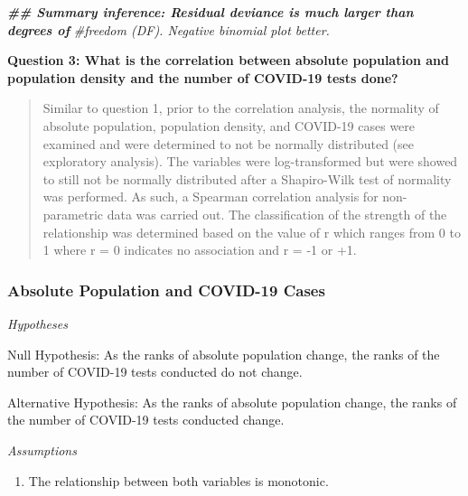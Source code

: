 \documentclass[
  12pt,
]{article}
\newenvironment{Shaded}{\begin{snugshade}}{\end{snugshade}}
\newcommand{\AttributeTok}[1]{\textcolor[rgb]{0.77,0.63,0.00}{#1}}
\newcommand{\CommentTok}[1]{\textcolor[rgb]{0.56,0.35,0.01}{\textit{#1}}}
\newcommand{\DocumentationTok}[1]{\textcolor[rgb]{0.56,0.35,0.01}{\textbf{\textit{#1}}}}
\newcommand{\FunctionTok}[1]{\textcolor[rgb]{0.00,0.00,0.00}{#1}}
\newcommand{\NormalTok}[1]{#1}
\newcommand{\OtherTok}[1]{\textcolor[rgb]{0.56,0.35,0.01}{#1}}
\newcommand{\SpecialCharTok}[1]{\textcolor[rgb]{0.00,0.00,0.00}{#1}}
\newcommand{\StringTok}[1]{\textcolor[rgb]{0.31,0.60,0.02}{#1}}
\providecommand{\tightlist}{%
  \setlength{\itemsep}{0pt}\setlength{\parskip}{0pt}}
\begin{document}
\begin{Shaded}
\begin{Highlighting}[]
\DocumentationTok{\#\# Summary inference: Residual deviance is much larger than degrees of}
\CommentTok{\#freedom (DF). Negative binomial plot better.}
\end{Highlighting}
\end{Shaded}

\textbf{Question 3: What is the correlation between absolute population
and population density and the number of COVID-19 tests done?}

\begin{quote}
Similar to question 1, prior to the correlation analysis, the normality
of absolute population, population density, and COVID-19 cases were
examined and were determined to not be normally distributed (see
exploratory analysis). The variables were log-transformed but were
showed to still not be normally distributed after a Shapiro-Wilk test of
normality was performed. As such, a Spearman correlation analysis for
non-parametric data was carried out. The classification of the strength
of the relationship was determined based on the value of r which ranges
from 0 to 1 where r = 0 indicates no association and r = -1 or +1.
\end{quote}

\hypertarget{absolute-population-and-covid-19-cases-1}{%
\subsubsection{Absolute Population and COVID-19
Cases}\label{absolute-population-and-covid-19-cases-1}}

\emph{Hypotheses}

Null Hypothesis: As the ranks of absolute population change, the ranks
of the number of COVID-19 tests conducted do not change.

Alternative Hypothesis: As the ranks of absolute population change, the
ranks of the number of COVID-19 tests conducted change.

\emph{Assumptions}

\begin{enumerate}
\def\labelenumi{\arabic{enumi}.}
\tightlist
\item
  The relationship between both variables is monotonic.
\end{enumerate}

\begin{Shaded}
\end{Shaded}
\end{document}
